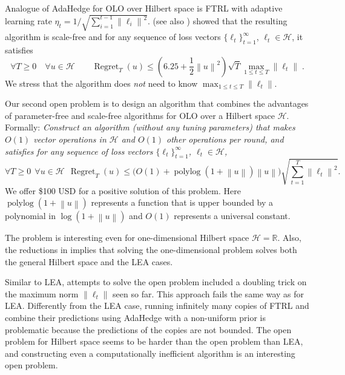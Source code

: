 \documentclass{colt2016} %
\DeclareMathOperator{\Regret}{Regret}
\DeclareMathOperator{\polylog}{polylog}
\newcommand{\R}{\mathbb{R}}     %
\renewcommand{\H}{\mathcal{H}}  %
\newcommand{\norm}[1]{\left\|{#1}\right\|}
\begin{document}
Analogue of AdaHedge for OLO over Hilbert space is FTRL with adaptive learning
rate $\eta_t = 1/\sqrt{\sum_{i=1}^{t-1} \norm{\ell_i}^2}$.
\cite{Orabona-Pal-2015} (see also \cite{Orabona-Pal-2016-scale-free}) showed
that the resulting algorithm is scale-free and for any sequence of loss vectors
$\{\ell_t\}_{t=1}^\infty$, $\ell_t \in \H$, it satisfies
$$
\forall T \ge 0 \quad \forall u \in \H \qquad \Regret_T(u) \le \left(6.25 + \frac{1}{2}\norm{u}^2 \right) \sqrt{T} \max_{1 \le t \le T} \norm{\ell_t} \; .
$$
We stress that the algorithm does \emph{not} need to know $\max_{1 \le t \le T}
\norm{\ell_t}$.

Our second open problem is to design an algorithm that combines the advantages
of parameter-free and scale-free algorithms for OLO over a Hilbert space $\H$.
Formally: \emph{Construct an algorithm (without any tuning parameters) that
makes $O(1)$ vector operations in $\H$ and $O(1)$ other operations per round,
and satisfies for any sequence of loss vectors $\{\ell_t\}_{t=1}^\infty$,
$\ell_t \in \H$,}
$$
\forall T \ge 0 \ \ \forall u \in \H \ \ \Regret_T(u) \le \big(O(1)+\polylog(1 + \norm{u})\norm{u}\big)  \sqrt{\sum_{t=1}^{T} \norm{\ell_t}^2}.
$$
We offer \$100 USD for a positive solution of this problem.  Here $\polylog(1 +
\norm{u})$ represents a function that is upper bounded by a polynomial in
$\log(1+\norm{u})$ and $O(1)$ represents a universal constant.

The problem is interesting even for one-dimensional Hilbert space $\H = \R$.
Also, the reductions in \cite{Orabona-Pal-2016-parameter-free} implies that
solving the one-dimensional problem solves both the general Hilbert space and the
LEA cases.

Similar to LEA, attempts to solve the open problem included a doubling trick on
the maximum norm $\norm{\ell_t}$ seen so far. This approach fails the same way
as for LEA. Differently from the LEA case, running infinitely many copies of
FTRL and combine their predictions using AdaHedge with a non-uniform prior is
problematic because the predictions of the copies are not bounded. The open
problem for Hilbert space seems to be harder than the open problem than LEA,
and constructing even a computationally inefficient algorithm is an interesting
open problem.


\end{document}
